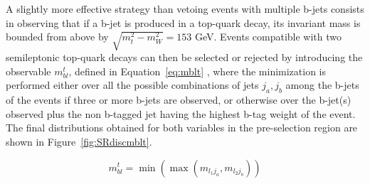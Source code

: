 \documentclass[a4paper, 10pt, openright]{report}
\begin{document}
A slightly more effective strategy than vetoing events with multiple b-jets consists in observing that if a b-jet is produced in a top-quark decay, its invariant mass is bounded from above by $\sqrt{m_t^2 - m_{W}^2} = 153$ GeV. Events compatible with two semileptonic top-quark decays can then be selected or rejected by introducing the observable $m_{bl}^t$, defined in Equation~\ref{eq:mblt} \cite{mblt}, where the minimization is performed either over all the possible combinations of jets {$j_a, j_b$} among the b-jets of the events if three or more b-jets are observed, or otherwise over the b-jet(s) observed plus the non b-tagged jet having the highest b-tag weight of the event. The final distributions obtained for both variables in the pre-selection region are shown in Figure~\ref{fig:SRdiscmblt}.

\begin{equation}
\label{eq:mblt}
m_{bl}^t = \min \left (\max(m_{l_1 j_a}, m_{l_2 j_b}) \right)
\end{equation}
%
%
\end{document}

